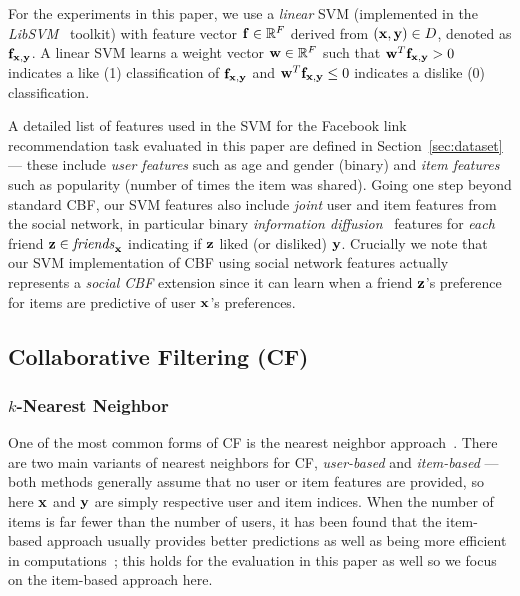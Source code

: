 For the experiments in this paper, we use a \emph{linear} SVM
(implemented in the \emph{LibSVM}~\cite{libsvm} toolkit) with feature
vector $\mathbf{f} \in \mathbb{R}^F$ derived from $(\mathbf{x},\mathbf{y}) \in D$, denoted as
$\mathbf{f}_{\mathbf{x},\mathbf{y}}$.  A linear SVM learns a weight vector $\mathbf{w} \in
\mathbb{R}^F$ such that $\mathbf{w}^T \mathbf{f}_{\mathbf{x},\mathbf{y}} > 0$ indicates a 
like (1) classification of $\mathbf{f}_{\mathbf{x},\mathbf{y}}$ and $\mathbf{w}^T \mathbf{f}_{\mathbf{x},\mathbf{y}} \leq 0$
indicates a dislike (0) classification.

A detailed list of features used in the SVM for the Facebook link
recommendation task evaluated in this paper are defined in
Section~\ref{sec:dataset} --- these include \emph{user features} such
as age and gender (binary) and \emph{item features} such as popularity
(number of times the item was shared).  Going one step beyond standard
CBF, our SVM features also include \emph{joint} user and item
features from the social network, in particular binary 
\emph{information diffusion}~\cite{inf_diffusion} features
for \emph{each} friend $\mathbf{z} \in \mathit{friends}_{\mathbf{x}}$ indicating if $\mathbf{z}$
liked (or disliked) $\mathbf{y}$.  Crucially we note that our SVM
implementation of CBF using social network features actually
represents a \emph{social CBF} extension since it can learn when a friend
$\mathbf{z}$'s preference for items are predictive of user $\mathbf{x}$'s preferences.

\subsection{Collaborative Filtering (CF)}

\subsubsection{$k$-Nearest Neighbor}
\label{sec:nn}

One of the most common forms of CF is the nearest neighbor
approach~\cite{bellkor}. 
There are two main variants of nearest neighbors for
CF, \emph{user-based} and \emph{item-based} --- both
methods generally assume that no user or item features are provided,
so here $\mathbf{x}$ and $\mathbf{y}$ are simply respective user and item indices.
When the
number of items is far fewer than the number of users, it has been
found that the item-based approach usually provides better predictions
as well as being more efficient in computations~\cite{bellkor};
this holds for the evaluation in this paper as well so 
we focus on the item-based approach here.

